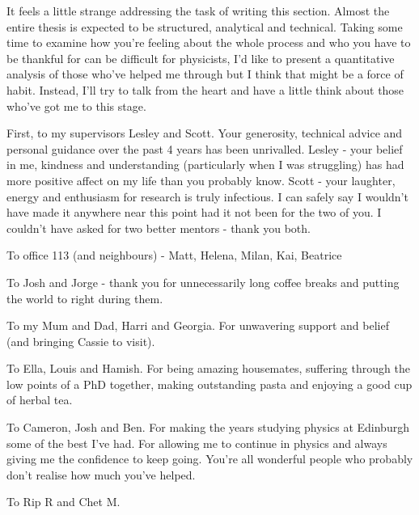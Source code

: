 \begin{acknowledgements}

It feels a little strange addressing the task of writing this section. Almost the entire thesis is expected to be structured, analytical and technical. Taking some time to examine how you're feeling about the whole process and who you have to be thankful for can be difficult for physicists, I'd like to present a quantitative analysis of those who've helped me through but I think that might be a force of habit. Instead, I'll try to talk from the heart and have a little think about those who've got me to this stage.

First, to my supervisors Lesley and Scott. Your generosity, technical advice and personal guidance over the past 4 years has been unrivalled. Lesley - your belief in me, kindness and understanding (particularly when I was struggling) has had more positive affect on my life than you probably know. Scott - your laughter, energy and enthusiasm for research is truly infectious. I can safely say I wouldn't have made it anywhere near this point had it not been for the two of you. I couldn't have asked for two better mentors - thank you both.

To office 113 (and neighbours) - Matt, Helena, Milan, Kai, Beatrice  

To Josh and Jorge - thank you for unnecessarily long coffee breaks and putting the world to right during them.

To my Mum and Dad, Harri and Georgia. For unwavering support and belief (and bringing Cassie to visit).

To Ella, Louis and Hamish. For being amazing housemates, suffering through the low points of a PhD together, making outstanding pasta and enjoying a good cup of herbal tea. 

To Cameron, Josh and Ben. For making the years studying physics at Edinburgh some of the best I've had. For allowing me to continue in physics and always giving me the confidence to keep going. You're all wonderful people who probably don't realise how much you've helped.

To Rip R and Chet M. 


\end{acknowledgements}




